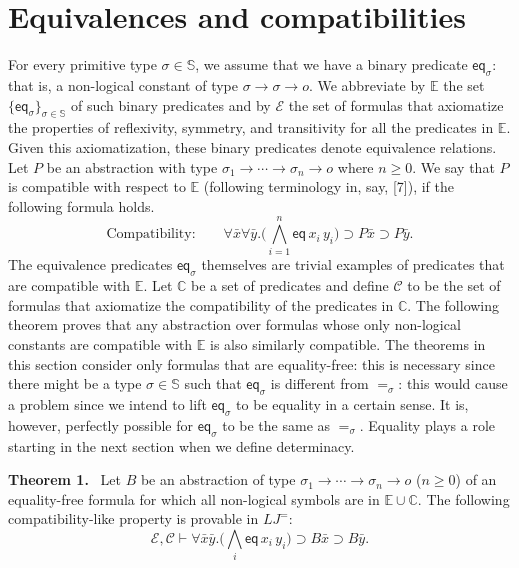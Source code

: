 \documentclass[10pt,a4paper]{article}
\newcommand{\pmLJ}{\mathit{LJ}}
\newcommand{\pmS}{\mathbb S}
\newcommand{\pmEs}{\mathbb E}\newcommand{\pmCs}{\mathbb C}
\newcommand{\pmEa}{\mathcal E}\newcommand{\pmCa}{\mathcal C}
\newcommand{\pmeq}{\mathsf{eq}}
\newcommand{\pmorig}[2]{\par\medskip\noindent\textbf{#1 #2.}\ }
\newcommand{\pmbx}{\bar x}\newcommand{\pmby}{\bar y}
\begin{document}
\section*{Equivalences and compatibilities}
For every primitive type $\sigma\in\pmS$, we assume that we have a binary predicate $\pmeq_\sigma$: that is, a non-logical constant of type $\sigma\to\sigma\to o$. We abbreviate by $\pmEs$ the set $\{\pmeq_\sigma\}_{\sigma\in\pmS}$ of such binary predicates and by $\pmEa$ the set of formulas that axiomatize the properties of reflexivity, symmetry, and transitivity for all the predicates in $\pmEs$. Given this axiomatization, these binary predicates denote equivalence relations.
Let $P$ be an abstraction with type $\sigma_1\to\cdots\to\sigma_n\to o$ where $n\geq0$. We say that $P$ is compatible with respect to $\pmEs$ (following terminology in, say, [7]), if the following formula holds.
\[\text{Compatibility:}\qquad\forall\pmbx\forall\pmby.\Big(\bigwedge_{i=1}^n\pmeq\,x_i\,y_i\Big)\supset P\pmbx\supset P\pmby.\]
The equivalence predicates $\pmeq_\sigma$ themselves are trivial examples of predicates that are compatible with $\pmEs$.
Let $\pmCs$ be a set of predicates and define $\pmCa$ to be the set of formulas that axiomatize the compatibility of the predicates in $\pmCs$. The following theorem proves that any abstraction over formulas whose only non-logical constants are compatible with $\pmEs$ is also similarly compatible.
The theorems in this section consider only formulas that are equality-free: this is necessary since there might be a type $\sigma\in\pmS$ such that $\pmeq_\sigma$ is different from $=_\sigma$: this would cause a problem since we intend to lift $\pmeq_\sigma$ to be equality in a certain sense. It is, however, perfectly possible for $\pmeq_\sigma$ to be the same as $=_\sigma$. Equality plays a role starting in the next section when we define determinacy.
\pmorig{Theorem}{1} Let $B$ be an abstraction of type $\sigma_1\to\cdots\to\sigma_n\to o$ ($n\geq0$) of an equality-free formula for which all non-logical symbols are in $\pmEs\cup\pmCs$. The following compatibility-like property is provable in $\pmLJ^=$:
\[\pmEa,\pmCa\vdash\forall\pmbx\pmby.\Big(\bigwedge_i\pmeq\,x_i\,y_i\Big)\supset B\pmbx\supset B\pmby.\]
\end{document}
